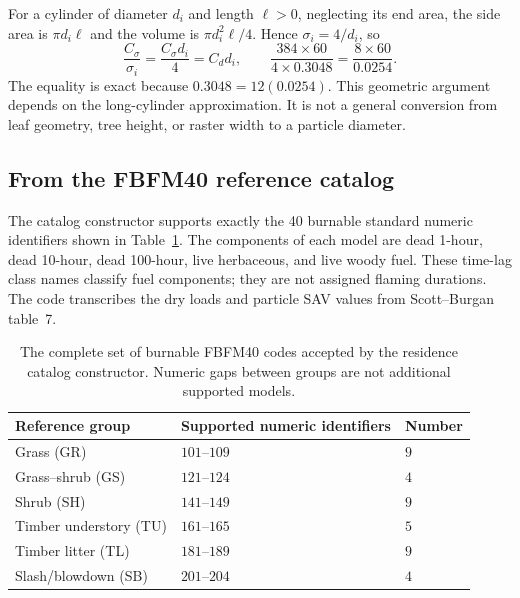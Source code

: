 \documentclass[11pt,a4paper]{article}
\begin{document}
For a cylinder of diameter $d_i$ and length $\ell>0$, neglecting its end area,
the side area is $\pi d_i\ell$ and the volume is $\pi d_i^2\ell/4$. Hence
$\sigma_i=4/d_i$, so
\begin{equation}
 \frac{C_\sigma}{\sigma_i}
 =\frac{C_\sigma d_i}{4}=C_d d_i,
 \qquad
 \frac{384\times60}{4\times0.3048}
 =\frac{8\times60}{0.0254}.
\end{equation}
The equality is exact because $0.3048=12(0.0254)$. This geometric argument
depends on the long-cylinder approximation. It is not a general conversion
from leaf geometry, tree height, or raster width to a particle diameter.

\subsection{From the FBFM40 reference catalog}

The catalog constructor supports exactly the 40 burnable standard numeric
identifiers shown in Table~\ref{tab:fbfm-groups}. The components of each model
are dead 1-hour, dead 10-hour, dead 100-hour, live herbaceous, and live woody
fuel. These time-lag class names classify fuel components; they are not assigned
flaming durations. The code transcribes the dry loads and particle SAV values
from Scott--Burgan table~7.\cite{scottburgan2005}

\begin{table}[htbp]
\centering
\begin{tabular}{lll}
\hline
Reference group & Supported numeric identifiers & Number\\
\hline
Grass (GR) & $101$--$109$ & $9$\\
Grass--shrub (GS) & $121$--$124$ & $4$\\
Shrub (SH) & $141$--$149$ & $9$\\
Timber understory (TU) & $161$--$165$ & $5$\\
Timber litter (TL) & $181$--$189$ & $9$\\
Slash/blowdown (SB) & $201$--$204$ & $4$\\
\hline
\end{tabular}
\caption{The complete set of burnable FBFM40 codes accepted by the residence
catalog constructor. Numeric gaps between groups are not additional supported
models.}
\label{tab:fbfm-groups}
\end{table}
\end{document}
